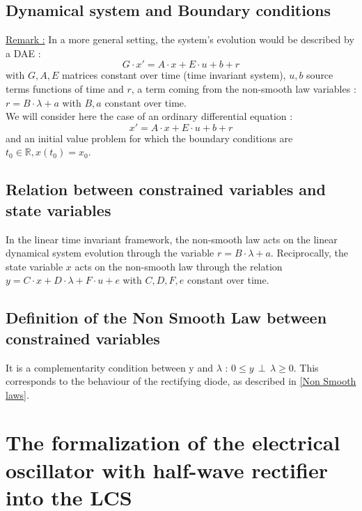 \documentclass[10pt]{article}
\begin{document}
\subsection{Dynamical system and Boundary conditions}
\underline{Remark :}
In a more general setting, the system's evolution would be described by a DAE :
\[
G \cdot x' = A \cdot x + E \cdot u + b + r 
\]
with $G , A , E$ matrices constant over time (time invariant system), $u , b$ source terms functions of time and $r$,
a term coming from the non-smooth law variables : $r = B \cdot \lambda + a$ with $B , a$ constant over time.\\
We will consider here the case of an ordinary differential equation :
\[
x' = A \cdot x + E \cdot u + b + r 
\]
and an initial value problem for which the boundary conditions are $t_0 \in \mathbb{R} , x(t_0)= x_0$.

\subsection{Relation between constrained variables and state variables}
In the linear time invariant framework, the non-smooth law acts on the linear dynamical system evolution through the variable 
$r = B \cdot \lambda + a$. Reciprocally, the state variable $x$ acts on the non-smooth law through the relation
$y = C \cdot x + D \cdot \lambda + F \cdot u + e$ with $C , D , F , e$ constant over time.

\subsection{Definition of the Non Smooth Law between constrained variables}
It is a complementarity condition between y and $\lambda$ : $0 \leq y \, \perp \, \lambda \geq 0$. This corresponds
to the behaviour of the rectifying diode, as described in \ref{Non Smooth laws}.
 
\section{The formalization of the electrical oscillator with half-wave rectifier into the LCS}
\end{document}
